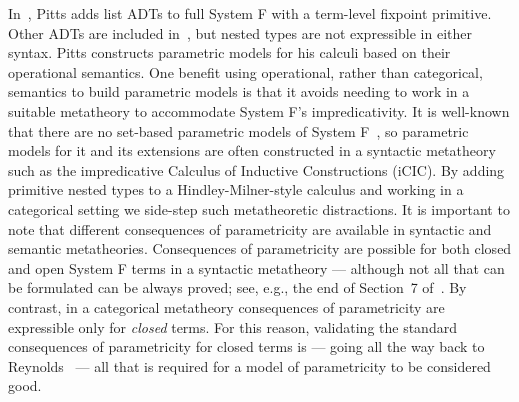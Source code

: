 \documentclass[runningheads]{llncs}
\begin{document}
In~\cite{pit00}, Pitts adds list ADTs to full System F with a
term-level fixpoint primitive. Other ADTs are included
in~\cite{pit98}, but nested types are not expressible in either
syntax.
%
%
Pitts constructs parametric models for his calculi based on their
operational semantics.  One benefit using operational, rather than
categorical, semantics to build parametric models is that it avoids
needing to work in a suitable metatheory to accommodate System F's
impredicativity. It is well-known that there are no set-based
parametric models of System F~\cite{rey84}, so parametric models for
it and its extensions are often constructed in a syntactic metatheory
such as the impredicative Calculus of Inductive Constructions (iCIC).
By adding primitive nested types to a Hindley-Milner-style calculus
and working in a categorical setting we side-step such metatheoretic
distractions. It is important to note that different consequences of
parametricity are available in syntactic and semantic
metatheories. Consequences of parametricity are possible for both
closed and open System F terms in a syntactic metatheory --- although
not all that can be formulated can be always proved; see, e.g., the
end of Section~7 of~\cite{bm98}. By contrast, in a categorical
metatheory consequences of parametricity are expressible only for {\em
  closed} terms. For this reason, validating the standard consequences
of parametricity for closed terms is --- going all the way back to
Reynolds~\cite{rey83} --- all that is required for a model of
parametricity to be considered good.
\end{document}
